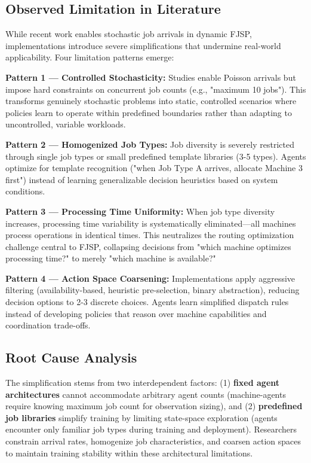 \subsection{Observed Limitation in Literature}

While recent work enables stochastic job arrivals in dynamic FJSP, implementations introduce severe simplifications that undermine real-world applicability. Four limitation patterns emerge:

\textbf{Pattern 1 — Controlled Stochasticity:} Studies enable Poisson arrivals but impose hard constraints on concurrent job counts (e.g., "maximum 10 jobs"). This transforms genuinely stochastic problems into static, controlled scenarios where policies learn to operate within predefined boundaries rather than adapting to uncontrolled, variable workloads.

\textbf{Pattern 2 — Homogenized Job Types:} Job diversity is severely restricted through single job types or small predefined template libraries (3-5 types). Agents optimize for template recognition ("when Job Type A arrives, allocate Machine 3 first") instead of learning generalizable decision heuristics based on system conditions.

\textbf{Pattern 3 — Processing Time Uniformity:} When job type diversity increases, processing time variability is systematically eliminated—all machines process operations in identical times. This neutralizes the routing optimization challenge central to FJSP, collapsing decisions from "which machine optimizes processing time?" to merely "which machine is available?"

\textbf{Pattern 4 — Action Space Coarsening:} Implementations apply aggressive filtering (availability-based, heuristic pre-selection, binary abstraction), reducing decision options to 2-3 discrete choices. Agents learn simplified dispatch rules instead of developing policies that reason over machine capabilities and coordination trade-offs.

\subsection{Root Cause Analysis}

The simplification stems from two interdependent factors: (1) \textbf{fixed agent architectures} cannot accommodate arbitrary agent counts (machine-agents require knowing maximum job count for observation sizing), and (2) \textbf{predefined job libraries} simplify training by limiting state-space exploration (agents encounter only familiar job types during training and deployment). Researchers constrain arrival rates, homogenize job characteristics, and coarsen action spaces to maintain training stability within these architectural limitations.

